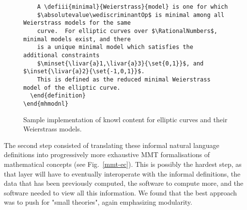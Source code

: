\begin{figure}
\begin{verbatim}
    A \defiii{minimal}{Weierstrass}{model} is one for which
    $\absolutevalue\wediscriminantOp$ is minimal among all Weierstrass models for the same
    curve.  For elliptic curves over $\RationalNumbers$, minimal models exist, and there
    is a unique minimal model which satisfies the additional constraints
    $\minset{\livar{a}1,\livar{a}3}{\set{0,1}}$, and $\inset{\livar{a}2}{\set{-1,0,1}}$. 
    This is defined as the reduced minimal Weierstrass model of the elliptic curve.
  \end{definition}
\end{mhmodnl}
\end{verbatim}
\caption{Sample \protect\stex implementation of \LMFDB knowl content for elliptic curves and their Weierstrass models.}
\label{stex-ec}
\end{figure}

The second step consisted of translating these informal natural language definitions into progressively more exhaustive MMT formalisations of mathematical concepts (see Fig.~\ref{mmt-ec}). This is possibly the hardest step, as that layer will have to eventually interoperate with the informal \stex definitions, the data that has been previously computed, the software to compute more, and the software needed to view all this information. We found that the best approach was to push for "small theories", again emphasizing modularity. 







